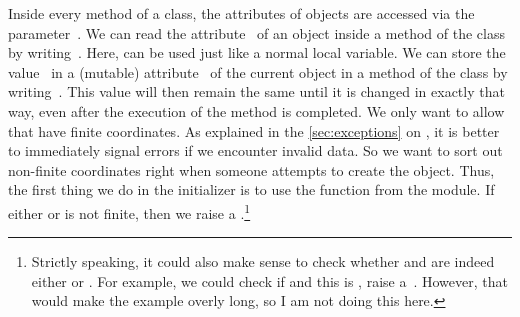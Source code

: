 Inside every method of a class, the attributes of objects are accessed via the parameter~.
We can read the attribute~ of an object inside a method of the class by writing~.
Here,  can be used just like a normal local variable.
We can store the value~ in a (mutable) attribute~ of the current object in a method of the class by writing~.
This value will then remain the same until it is changed in exactly that way, even after the execution of the method is completed.%
%
%
We only want to allow  that have finite coordinates.
As explained in the \cref{sec:exceptions} on , it is better to immediately signal errors if we encounter invalid data.
So we want to sort out non-finite coordinates right when someone attempts to create the  object.
Thus, the first thing we do in the initializer is to use the  function from the  module.
If either  or  is not finite, then we raise a .\footnote{%
Strictly speaking, it could also make sense to check whether  and  are indeed either  or . %
For example, we could check if  and this is , raise a~. %
However, that would make the example overly long, so I am not doing this here.%
}


